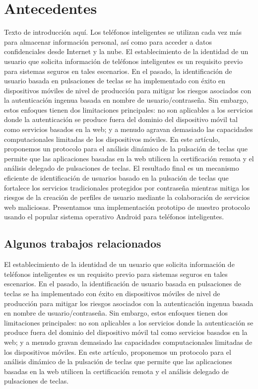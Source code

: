 \documentclass{article}
\begin{document}
	\section{Antecedentes} 
	Texto de introducción aquí. Los teléfonos inteligentes se utilizan cada vez más para almacenar información personal, así como para acceder a datos confidenciales desde Internet y la nube. El establecimiento de la identidad de un usuario que solicita información de teléfonos inteligentes es un requisito previo para sistemas seguros en tales escenarios. En el pasado, la identificación de usuario basada en pulsaciones de teclas se ha implementado con éxito en dispositivos móviles de nivel de producción para mitigar los riesgos asociados con la autenticación ingenua basada en nombre de usuario/contraseña. Sin embargo, estos enfoques tienen dos limitaciones principales: no son aplicables a los servicios donde la autenticación se produce fuera del dominio del dispositivo móvil tal como servicios basados en la web; y a menudo agravan demasiado las capacidades computacionales limitadas de los dispositivos móviles.  En este artículo, proponemos un protocolo para el análisis dinámico de la pulsación de teclas que permite que las aplicaciones basadas en la web utilicen la certificación remota y el análisis delegado de pulsaciones de teclas. El resultado final es un mecanismo eficiente de identificación de usuarios basado en la pulsación de teclas que fortalece los servicios tradicionales protegidos por contraseña
	mientras mitiga los riesgos de la creación de perfiles de usuario mediante la colaboración de servicios web maliciosas. 
	Presentamos una implementación prototipo de nuestro protocolo usando
	el popular sistema operativo Android para teléfonos inteligentes.
	
	\subsection{Algunos trabajos relacionados} 
	El establecimiento de la identidad de un usuario que solicita información de teléfonos inteligentes es un requisito previo para sistemas seguros en tales escenarios. En el pasado, la identificación de usuario basada en pulsaciones de teclas se ha implementado con éxito en dispositivos móviles de nivel de producción para mitigar los riesgos asociados con la autenticación ingenua basada en nombre de usuario/contraseña. Sin embargo, estos enfoques tienen dos limitaciones principales: no son aplicables a los servicios donde la autenticación se produce fuera del dominio del dispositivo móvil
	tal como servicios basados en la web; y a menudo gravan demasiado las capacidades computacionales limitadas de los dispositivos móviles. En este artículo, proponemos un protocolo para el análisis dinámico de la pulsación de teclas que permite que las aplicaciones basadas en la web utilicen la certificación remota y el análisis delegado de pulsaciones de teclas.
	
\end{document}

